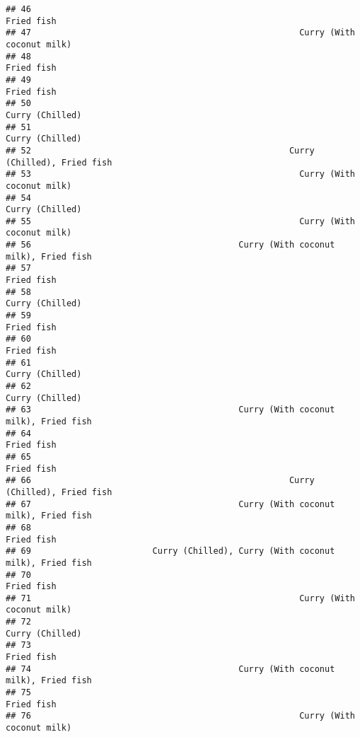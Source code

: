 \documentclass[
]{article}
\begin{document}
\begin{verbatim}
## 46                                                                    Fried fish
## 47                                                     Curry (With coconut milk)
## 48                                                                    Fried fish
## 49                                                                    Fried fish
## 50                                                               Curry (Chilled)
## 51                                                               Curry (Chilled)
## 52                                                   Curry (Chilled), Fried fish
## 53                                                     Curry (With coconut milk)
## 54                                                               Curry (Chilled)
## 55                                                     Curry (With coconut milk)
## 56                                         Curry (With coconut milk), Fried fish
## 57                                                                    Fried fish
## 58                                                               Curry (Chilled)
## 59                                                                    Fried fish
## 60                                                                    Fried fish
## 61                                                               Curry (Chilled)
## 62                                                               Curry (Chilled)
## 63                                         Curry (With coconut milk), Fried fish
## 64                                                                    Fried fish
## 65                                                                    Fried fish
## 66                                                   Curry (Chilled), Fried fish
## 67                                         Curry (With coconut milk), Fried fish
## 68                                                                    Fried fish
## 69                        Curry (Chilled), Curry (With coconut milk), Fried fish
## 70                                                                    Fried fish
## 71                                                     Curry (With coconut milk)
## 72                                                               Curry (Chilled)
## 73                                                                    Fried fish
## 74                                         Curry (With coconut milk), Fried fish
## 75                                                                    Fried fish
## 76                                                     Curry (With coconut milk)

\end{verbatim}
\end{document}
